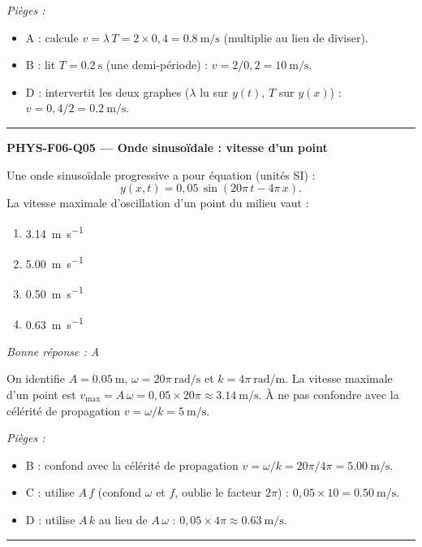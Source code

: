 \documentclass[11pt,a4paper]{article}
\begin{document}
\textit{Pièges :}
\begin{itemize}
\item A : calcule $v = \lambda\,T = 2\times0{,}4 = \qty{0.8}{\metre\per\second}$ (multiplie au lieu de diviser).
\item B : lit $T = \qty{0.2}{\second}$ (une demi-période) : $v = 2/0{,}2 = \qty{10}{\metre\per\second}$.
\item D : intervertit les deux graphes ($\lambda$ lu sur $y(t)$, $T$ sur $y(x)$) : $v = 0{,}4/2 = \qty{0.2}{\metre\per\second}$.
\end{itemize}
\vspace{8pt}\hrule\vspace{8pt}

\noindent\textbf{PHYS-F06-Q05 --- Onde sinusoïdale : vitesse d'un point}\par
Une onde sinusoïdale progressive a pour équation (unités SI) :
\[ y(x,t) = 0{,}05\,\sin\!\left(20\pi\,t - 4\pi\,x\right). \]
La vitesse maximale d'oscillation d'un point du milieu vaut :
\begin{enumerate}[label=\Alph*)]
\item \qty{3.14}{\metre\per\second}
\item \qty{5.00}{\metre\per\second}
\item \qty{0.50}{\metre\per\second}
\item \qty{0.63}{\metre\per\second}
\end{enumerate}
\textit{Bonne réponse : A}\par
On identifie $A = \qty{0.05}{\metre}$, $\omega = 20\pi~\si{\radian\per\second}$ et $k = 4\pi~\si{\radian\per\metre}$. La vitesse maximale d'un point est $v_{\max} = A\,\omega = 0{,}05\times20\pi \approx \qty{3.14}{\metre\per\second}$. À ne pas confondre avec la célérité de propagation $v = \omega/k = \qty{5}{\metre\per\second}$.\par
\textit{Pièges :}
\begin{itemize}
\item B : confond avec la célérité de propagation $v = \omega/k = 20\pi/4\pi = \qty{5.00}{\metre\per\second}$.
\item C : utilise $A\,f$ (confond $\omega$ et $f$, oublie le facteur $2\pi$) : $0{,}05\times10 = \qty{0.50}{\metre\per\second}$.
\item D : utilise $A\,k$ au lieu de $A\,\omega$ : $0{,}05\times4\pi \approx \qty{0.63}{\metre\per\second}$.
\end{itemize}
\vspace{8pt}\hrule\vspace{8pt}
\end{document}
